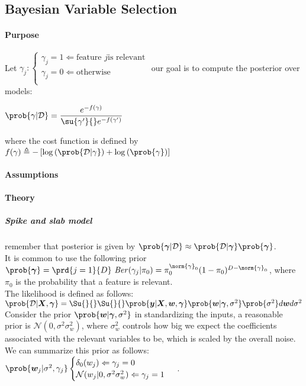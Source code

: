 \subsection{Bayesian Variable Selection}
\paragraph{Purpose}
Let $\gamma_{j}: 
\begin{cases}
    \gamma_{j} = 1 \Leftarrow \text{feature } j \text{is relevant}\\
    \gamma_{j} = 0 \Leftarrow \text{otherwise}\\
\end{cases}$ our goal is to compute the posterior over models:
\begin{center}
    $\prob{\gamma|\mathcal{D}} = \dfrac{e^{-f(\gamma)}}{\su{\gamma'}{}e^{-f(\gamma')}}$
\end{center}
where the cost function is defined by $f(\gamma) \triangleq -\left[\log\left(\prob{
\mathcal{D}|\gamma}\right) + \log\left(\prob{\gamma}\right)\right]$

\paragraph{Assumptions}
\paragraph{Theory}
\subparagraph{Spike and slab model}
remember that posterior is given by $\prob{\bm{\gamma}|\mathcal{D}}\approx \prob{
\mathcal{D}|\bm{\gamma}}\prob{\bm{\gamma}}$.\\
It is common to use the following prior $\prob{\bm{\gamma}} = \prd{j=1}{D}\text{
\emph{Ber}}(\gamma_{j}|\pi_{0}) = \pi_{0}^{\norm{\gamma}_{0}}(1-\pi_{0})^{D-\norm{
\gamma}_{0}}$, where $\pi_{0}$ is the probability that a feature is relevant.\\
The likelihood is defined as follows: $\prob{\mathcal{D}|\bm{X},\bm{\gamma}} = 
\Su{}{}\Su{}{}\prob{\bm{y}|\bm{X},\bm{w},\bm{\gamma}}\prob{\bm{w}|\bm{\gamma},
\sigma^{2}}\prob{\sigma^{2}}d\bm{w}d\sigma^{2}$\\
Consider the prior $\prob{\bm{w}|\bm{\gamma},\sigma^{2}}$ in standardizing the inputs, 
a reasonable prior is $\mathcal{N}(0, \sigma^{2}\sigma_{w}^{2})$, where 
$\sigma_{w}^{2}$ controls how big we expect the coefficients associated with the 
relevant variables to be, which is scaled by the overall noise. We can summarize this 
prior as follows: $\prob{\bm{w}_{j}|\sigma^{2},\gamma_{j}}
\begin{cases}
    \delta_{0}(w_{j}) \Leftarrow \gamma_{j} = 0\\
    \mathcal{N}(w_{j}|0, \sigma^{2}\sigma_{w}^{2}) \Leftarrow \gamma_{j} = 1
\end{cases}$
.

